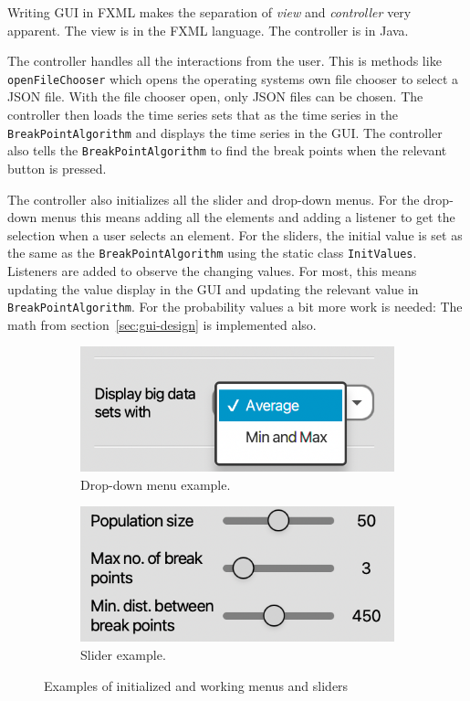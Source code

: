 Writing GUI in FXML makes the separation of \textit{view} and
\textit{controller} very apparent. The view is in the FXML language. The
controller is in Java. 

The controller handles all the interactions from the user. This is methods like
\texttt{openFileChooser} which opens the operating systems own file chooser to
select a JSON file. With the file chooser open, only JSON files can be chosen.
The controller then loads the time series sets that as the time series in the
\texttt{BreakPointAlgorithm} and displays the time series in the GUI. The
controller also tells the \texttt{BreakPointAlgorithm} to find the break points
when the relevant button is pressed. 

The controller also initializes all the slider and drop-down menus. For the
drop-down menus this means adding all the elements and adding a listener to get
the selection when a user selects an element. For the sliders, the initial value
is set as the same as the \texttt{BreakPointAlgorithm} using the static class
\texttt{InitValues}. Listeners are added to observe the changing values. For
most, this means updating the value display in the GUI and updating the relevant
value in \texttt{BreakPointAlgorithm}. For the probability values a bit more
work is needed: The math from section~\ref{sec:gui-design} is implemented also. 

\begin{figure}[ht]
    \centering
    \begin{subfigure}[b]{.48\textwidth}
        \centering
        \includegraphics[width=\textwidth]{fig/drop-down-menu.png}
        \caption{Drop-down menu example. }
        \label{fig:gui-drop-down}
    \end{subfigure}
    \hfill
    \begin{subfigure}[b]{.48\textwidth}
        \centering
        \includegraphics[width=\textwidth]{fig/sliders.png}
        \caption{Slider example.}
        \label{fig:gui-slider}
    \end{subfigure}
    \caption{Examples of initialized and working menus and sliders}
    \label{fig:gui-controls}
\end{figure}


